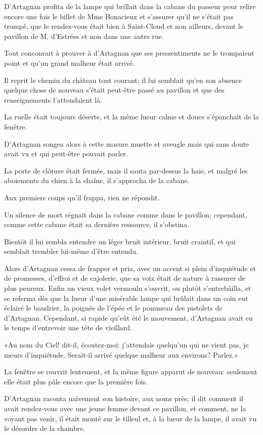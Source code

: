 D'Artagnan profita de la lampe qui brillait dans la cabane du passeur pour relire encore une fois le billet de Mme Bonacieux et s'assurer qu'il ne s'était pas trompé, que le rendez-vous était bien à Saint-Cloud et non ailleurs, devant le pavillon de M. d'Estrées et non dans une autre rue. 

Tout concourait à prouver à d'Artagnan que ses pressentiments ne le trompaient point et qu'un grand malheur était arrivé. 

Il reprit le chemin du château tout courant; il lui semblait qu'en son absence quelque chose de nouveau s'était peut-être passé au pavillon et que des renseignements l'attendaient là. 

La ruelle était toujours déserte, et la même lueur calme et douce s'épanchait de la fenêtre. 

D'Artagnan songea alors à cette masure muette et aveugle mais qui sans doute avait vu et qui peut-être pouvait parler. 

La porte de clôture était fermée, mais il sauta par-dessus la haie, et malgré les aboiements du chien à la chaîne, il s'approcha de la cabane. 

Aux premiers coups qu'il frappa, rien ne répondit. 

Un silence de mort régnait dans la cabane comme dans le pavillon; cependant, comme cette cabane était sa dernière ressource, il s'obstina. 

Bientôt il lui sembla entendre un léger bruit intérieur, bruit craintif, et qui semblait trembler lui-même d'être entendu. 

Alors d'Artagnan cessa de frapper et pria, avec un accent si plein d'inquiétude et de promesses, d'effroi et de cajolerie, que sa voix était de nature à rassurer de plus peureux. Enfin un vieux volet vermoulu s'ouvrit, ou plutôt s'entrebâilla, et se referma dès que la lueur d'une misérable lampe qui brûlait dans un coin eut éclairé le baudrier, la poignée de l'épée et le pommeau des pistolets de d'Artagnan. Cependant, si rapide qu'eût été le mouvement, d'Artagnan avait eu le temps d'entrevoir une tête de vieillard. 

«Au nom du Ciel! dit-il, écoutez-moi: j'attendais quelqu'un qui ne vient pas, je meurs d'inquiétude. Serait-il arrivé quelque malheur aux environs? Parlez.» 

La fenêtre se rouvrit lentement, et la même figure apparut de nouveau: seulement elle était plus pâle encore que la première fois. 

D'Artagnan raconta naïvement son histoire, aux noms près; il dit comment il avait rendez-vous avec une jeune femme devant ce pavillon, et comment, ne la voyant pas venir, il était monté sur le tilleul et, à la lueur de la lampe, il avait vu le désordre de la chambre. 

